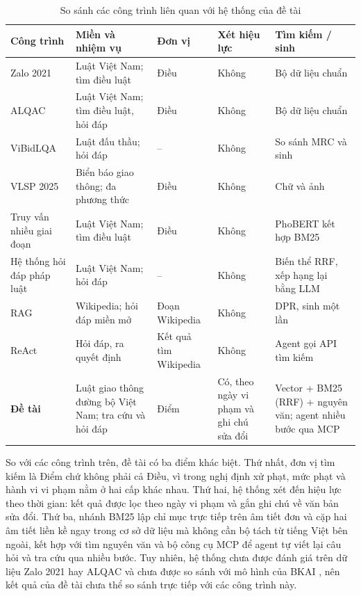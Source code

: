 \begin{table}[H]
\centering
\caption{So sánh các công trình liên quan với hệ thống của đề tài}
\label{tab:c2_so_sanh}
\footnotesize
\renewcommand{\arraystretch}{1.05}
\begin{tabularx}{\textwidth}{@{}>{\raggedright\arraybackslash}p{2.6cm} >{\raggedright\arraybackslash}X >{\raggedright\arraybackslash}p{1.7cm} >{\raggedright\arraybackslash}p{1.5cm} >{\raggedright\arraybackslash}X@{}}
\toprule
\textbf{Công trình} & \textbf{Miền và nhiệm vụ} & \textbf{Đơn vị} & \textbf{Xét hiệu lực} & \textbf{Tìm kiếm / sinh} \\
\midrule
Zalo 2021 \cite{zalo2021legal} & Luật Việt Nam; tìm điều luật & Điều & Không & Bộ dữ liệu chuẩn \\
ALQAC \cite{nguyen2021alqac,nguyen2023alqac} & Luật Việt Nam; tìm điều luật, hỏi đáp & Điều & Không & Bộ dữ liệu chuẩn \\
ViBidLQA \cite{nguyen2024vibidlqa} & Luật đấu thầu; hỏi đáp & -- & Không & So sánh MRC và sinh \\
VLSP 2025 \cite{luu2025vlsp} & Biển báo giao thông; đa phương thức & Điều & Không & Chữ và ảnh \\
Truy vấn nhiều giai đoạn \cite{pham2022multistage} & Luật Việt Nam; tìm điều luật & Điều & Không & PhoBERT kết hợp BM25 \\
Hệ thống hỏi đáp pháp luật \cite{nguyenba2024legalir} & Luật Việt Nam; hỏi đáp & -- & Không & Biến thể RRF, xếp hạng lại bằng LLM \\
RAG \cite{lewis2020rag} & Wikipedia; hỏi đáp miền mở & Đoạn Wikipedia & Không & DPR, sinh một lần \\
ReAct \cite{yao2023react} & Hỏi đáp, ra quyết định & Kết quả tìm Wikipedia & Không & Agent gọi API tìm kiếm \\
\midrule
\textbf{Đề tài} & Luật giao thông đường bộ Việt Nam; tra cứu và hỏi đáp & Điểm & Có, theo ngày vi phạm và ghi chú sửa đổi & Vector + BM25 (RRF) + nguyên văn; agent nhiều bước qua MCP \\
\bottomrule
\end{tabularx}
\end{table}

So với các công trình trên, đề tài có ba điểm khác biệt. Thứ nhất, đơn vị tìm kiếm là Điểm chứ không phải cả Điều, vì trong nghị định xử phạt, mức phạt và hành vi vi phạm nằm ở hai cấp khác nhau. Thứ hai, hệ thống xét đến hiệu lực theo thời gian: kết quả được lọc theo ngày vi phạm và gắn ghi chú về văn bản sửa đổi. Thứ ba, nhánh BM25 lập chỉ mục trực tiếp trên âm tiết đơn và cặp hai âm tiết liền kề ngay trong cơ sở dữ liệu mà không cần bộ tách từ tiếng Việt bên ngoài, kết hợp với tìm nguyên văn và bộ công cụ MCP để agent tự viết lại câu hỏi và tra cứu qua nhiều bước. Tuy nhiên, hệ thống chưa được đánh giá trên dữ liệu Zalo 2021 hay ALQAC và chưa được so sánh với mô hình của BKAI \cite{duc2024bkai}, nên kết quả của đề tài chưa thể so sánh trực tiếp với các công trình này.

